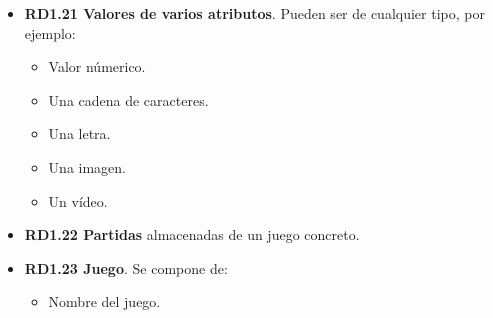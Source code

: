 \begin{itemize}
	\item \textbf{RD1.21 Valores de varios atributos}. Pueden ser de cualquier tipo, por ejemplo:
	\begin{itemize}
		\item Valor númerico.
		\item Una cadena de caracteres.
		\item Una letra.
		\item Una imagen.
		\item Un vídeo.
	\end{itemize}
	
	\item \textbf{RD1.22 Partidas} almacenadas de un juego concreto.
	
	\item \textbf{RD1.23 Juego}. Se compone de:
	\begin{itemize}
		\item Nombre del juego.
	\end{itemize}
\end{itemize}




